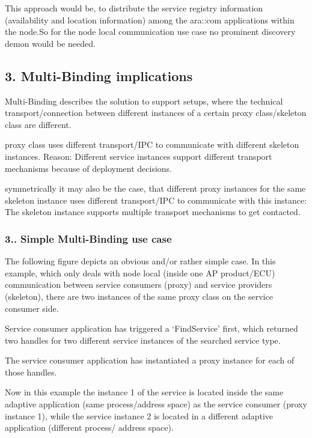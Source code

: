 \begin{DoxyItemize}
\item This approach would be, to distribute the service registry information (availability and location information) among the ara\+::com applications within the node.\+So for the node local communication use case no prominent discovery demon would be needed. 
\end{DoxyItemize}

\subsection*{3. Multi-\/\+Binding implications}


\begin{DoxyItemize}
\item Multi-\/\+Binding describes the solution to support setups, where the technical transport/connection between different instances of a certain proxy class/skeleton class are different.
\begin{DoxyItemize}
\item proxy class uses different transport/\+I\+PC to communicate with different skeleton instances. Reason\+: Different service instances support different transport mechanisms because of deployment decisions.
\item symmetrically it may also be the case, that different proxy instances for the same skeleton instance uses different transport/\+I\+PC to communicate with this instance\+: The skeleton instance supports multiple transport mechanisms to get contacted.
\end{DoxyItemize}
\end{DoxyItemize}

\subsubsection*{3.. Simple Multi-\/\+Binding use case}


\begin{DoxyItemize}
\item The following figure depicts an obvious and/or rather simple case. In this example, which only deals with node local (inside one AP product/\+E\+CU) communication between service consumers (proxy) and service providers (skeleton), there are two instances of the same proxy class on the service consumer side.
\item Service consumer application has triggered a ‘\+Find\+Service’ first, which returned two handles for two different service instances of the searched service type.
\item The service consumer application has instantiated a proxy instance for each of those handles.
\item Now in this example the instance 1 of the service is located inside the same adaptive application (same process/address space) as the service consumer (proxy instance 1), while the service instance 2 is located in a different adaptive application (different process/ address space). 
\end{DoxyItemize}

